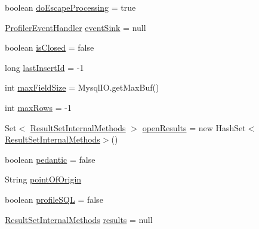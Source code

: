 \begin{DoxyCompactItemize}
\item 
boolean \mbox{\hyperlink{classcom_1_1mysql_1_1jdbc_1_1_statement_impl_ac89318ae9265ef923ce76f1e56b5b297}{do\+Escape\+Processing}} = true
\item 
\mbox{\hyperlink{interfacecom_1_1mysql_1_1jdbc_1_1profiler_1_1_profiler_event_handler}{Profiler\+Event\+Handler}} \mbox{\hyperlink{classcom_1_1mysql_1_1jdbc_1_1_statement_impl_a45f5ac7c0faabe682cdf57cbdf5a629e}{event\+Sink}} = null
\item 
boolean \mbox{\hyperlink{classcom_1_1mysql_1_1jdbc_1_1_statement_impl_a781992c406cc15301d79be2289bcdbb5}{is\+Closed}} = false
\item 
long \mbox{\hyperlink{classcom_1_1mysql_1_1jdbc_1_1_statement_impl_ae875c00999a6710f7289ea4201d6a0bb}{last\+Insert\+Id}} = -\/1
\item 
int \mbox{\hyperlink{classcom_1_1mysql_1_1jdbc_1_1_statement_impl_a6fbfe09e01ced23b7a2e27813c1044ba}{max\+Field\+Size}} = Mysql\+I\+O.\+get\+Max\+Buf()
\item 
int \mbox{\hyperlink{classcom_1_1mysql_1_1jdbc_1_1_statement_impl_a8521af9b18af0dca06901f365696bf04}{max\+Rows}} = -\/1
\item 
Set$<$ \mbox{\hyperlink{interfacecom_1_1mysql_1_1jdbc_1_1_result_set_internal_methods}{Result\+Set\+Internal\+Methods}} $>$ \mbox{\hyperlink{classcom_1_1mysql_1_1jdbc_1_1_statement_impl_a52d3c6be6f876129be24142f26548a99}{open\+Results}} = new Hash\+Set$<$\mbox{\hyperlink{interfacecom_1_1mysql_1_1jdbc_1_1_result_set_internal_methods}{Result\+Set\+Internal\+Methods}}$>$()
\item 
boolean \mbox{\hyperlink{classcom_1_1mysql_1_1jdbc_1_1_statement_impl_a309071c80aab5b96c6e3af2c375d15c9}{pedantic}} = false
\item 
String \mbox{\hyperlink{classcom_1_1mysql_1_1jdbc_1_1_statement_impl_a74a888e1fdd2a77e7c7ab2ccd25cbb4c}{point\+Of\+Origin}}
\item 
boolean \mbox{\hyperlink{classcom_1_1mysql_1_1jdbc_1_1_statement_impl_ae6b91912ce642c28f0b4d807a48c2ea0}{profile\+S\+QL}} = false
\item 
\mbox{\hyperlink{interfacecom_1_1mysql_1_1jdbc_1_1_result_set_internal_methods}{Result\+Set\+Internal\+Methods}} \mbox{\hyperlink{classcom_1_1mysql_1_1jdbc_1_1_statement_impl_a6ef2ccc2504b90b0eceb713a09940bae}{results}} = null
\item 
\mbox{\label{classcom_1_1mysql_1_1jdbc_1_1_statement_impl_a381462224979011ac934537bf586375a}} 

\end{DoxyCompactItemize}

